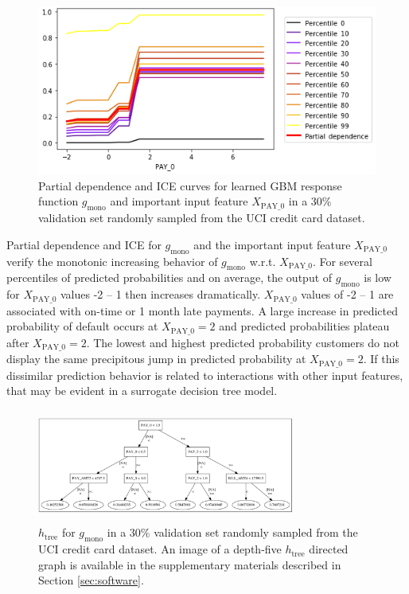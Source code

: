 \documentclass[sigconf]{acmart}
\begin{document}
\begin{figure}[htb]
	\begin{center}
		\includegraphics[scale=0.45]{img/figure_8.png}
		\caption{Partial dependence and ICE curves for learned GBM response function $g_{\text{mono}}$ and important input feature $X_{\text{PAY\_0}}$ in a 30\% validation set randomly sampled from the UCI credit card dataset.}
		\label{fig:cc_pdp_ice}
	\end{center}
\end{figure}

Partial dependence and ICE for $g_{\text{mono}}$ and the important input feature $X_{\text{PAY\_0}}$ verify the monotonic increasing behavior of $g_{\text{mono}}$ w.r.t. $X_{\text{PAY\_0}}$. For several percentiles of predicted probabilities and on average, the output of $g_{\text{mono}}$ is low for $X_{\text{PAY\_0}}$ values -2 -- 1 then increases dramatically. $X_{\text{PAY\_0}}$ values of -2 -- 1 are associated with on-time or 1 month late payments. A large increase in predicted probability of default occurs at $X_{\text{PAY\_0}} = 2$ and predicted probabilities plateau after $X_{\text{PAY\_0}} = 2$. The lowest and highest predicted probability customers do not display the same precipitous jump in predicted probability at $X_{\text{PAY\_0}} = 2$. If this dissimilar prediction behavior is related to interactions with other input features, that may be evident in a surrogate decision tree model.

\begin{figure}[htb]
	\begin{center}
		\includegraphics[height=105pt, width=240pt]{img/figure_9-eps-converted-to.pdf}
		\caption{$h_{\text{tree}}$ for $g_{\text{mono}}$ in a 30\% validation set randomly sampled from the UCI credit card dataset. An image of a depth-five $h_{\text{tree}}$ directed graph is available in the supplementary materials described in Section \ref{sec:software}.}
		\label{fig:cc_dt_surrogate}
	\end{center}
\end{figure}
\end{document}
